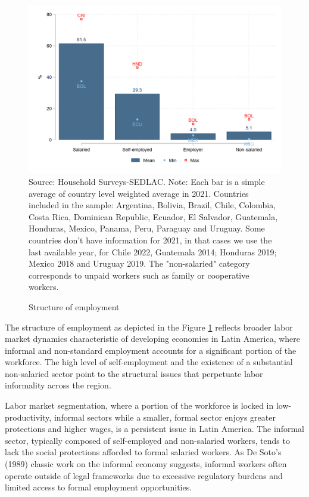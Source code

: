 \documentclass[english]{article}
\begin{document}
\begin{enumerate}
        \begin{figure}[h!tbp]
        \justifying
        \caption{Structure of employment}     
        \includegraphics[scale=.3]{latex/figures/Snapshot/Structure of employment.png}
        \label{fig:employment}
        \footnotesize{Source: Household Surveys-SEDLAC.}
        \footnotesize{Note: Each bar is a simple average of country level weighted average in 2021. Countries included in the sample: Argentina, Bolivia, Brazil, Chile, Colombia, Costa Rica, Dominican Republic, Ecuador, El Salvador, Guatemala, Honduras, Mexico, Panama, Peru, Paraguay and Uruguay. Some countries don’t have information for 2021, in that cases we use the last available year, for Chile 2022, Guatemala 2014; Honduras 2019; Mexico 2018 and Uruguay 2019. The "non-salaried" category corresponds to unpaid workers such as family or cooperative workers.}
        \end{figure}

The structure of employment as depicted in the Figure \ref{fig:employment} reflects broader labor market dynamics characteristic of developing economies in Latin America, where informal and non-standard employment accounts for a significant portion of the workforce. The high level of self-employment and the existence of a substantial non-salaried sector point to the structural issues that perpetuate labor informality across the region.

Labor market segmentation, where a portion of the workforce is locked in low-productivity, informal sectors while a smaller, formal sector enjoys greater protections and higher wages, is a persistent issue in Latin America. The informal sector, typically composed of self-employed and non-salaried workers, tends to lack the social protections afforded to formal salaried workers. As De Soto’s (1989) classic work on the informal economy suggests, informal workers often operate outside of legal frameworks due to excessive regulatory burdens and limited access to formal employment opportunities.


\end{enumerate}
\end{document}
